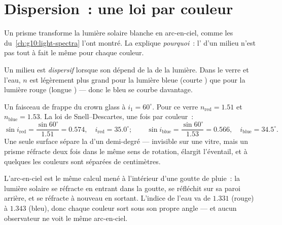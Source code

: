 \section{Dispersion~: une loi par couleur}

Un prisme transforme la lumière solaire blanche en arc-en-ciel, comme
les  du~\cref{ch:g10:light-spectra} l'ont montré. La
 explique \emph{pourquoi}~: l' d'un milieu n'est pas tout à fait le même pour chaque
couleur.

\begin{definition}[Dispersion]\label{def:g10:refraction:dispersion}
Un milieu est \emph{dispersif} lorsque son  dépend de la  de la lumière. Dans le
verre et l'eau, $n$ est légèrement plus grand pour la lumière bleue
(courte ) que pour la lumière rouge
(longue ) --- donc le bleu se courbe davantage.
\end{definition}

\begin{example}\label{ex:g10:refraction:twocolors}
Un faisceau de  frappe du crown glass à
$i_1 = 60^\circ$. Pour ce verre $n_{\text{red}} = 1.51$ et
$n_{\text{blue}} = 1.53$. La loi de Snell--Descartes, une fois par
couleur~:
\[
\sin i_{\text{red}} = \frac{\sin 60^\circ}{1.51} = 0.574,
\quad i_{\text{red}} = 35.0^\circ ;
\qquad
\sin i_{\text{blue}} = \frac{\sin 60^\circ}{1.53} = 0.566,
\quad i_{\text{blue}} = 34.5^\circ .
\]
Une seule surface sépare la  d'un demi-degré ---
invisible sur une vitre, mais un prisme réfracte deux fois dans le même
sens de rotation, élargit l'éventail, et à quelques  les couleurs
sont séparées de centimètres.
\end{example}

\begin{remark}\label{rem:g10:refraction:rainbow}
L'arc-en-ciel est le même calcul mené à l'intérieur d'une goutte de
pluie~: la lumière solaire se réfracte en entrant dans la goutte, se
réfléchit sur sa paroi arrière, et se réfracte à nouveau en sortant.
L'indice de l'eau va de $1.331$ (rouge) à $1.343$ (bleu), donc chaque
couleur sort sous son propre angle --- et aucun observateur ne voit le
même arc-en-ciel.
\end{remark}

